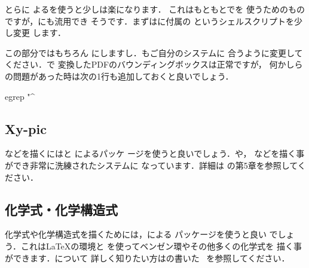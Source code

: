 \begin{InTeX}
\usepackage[dvipdfmx]{graphicx}
\end{InTeX}

とらに
よるを使うと少しは楽になります．
これはもともとでを
使うためのものですが，\prog{\pLaTeX}にも流用でき
そうです．まずはに付属の
というシェルスクリプトを少し変更
します．


この部分ではもちろん
にしますし．もご自分のシステムに
合うように変更してください．で
変換したPDFのバウンディングボックスは正常ですが，
何かしらの問題があった時は次の1行も追加しておくと良いでしょう．

\begin{InText}
    egrep "^%
\end{InText}


\subsection{Xy-pic}
などを描くにはと
によるパッケ
ージを使うと良いでしょう．や，
などを描く事ができ非常に洗練されたシステムに
なっています．詳細は\wasyo{\GCOMP}\cite{graphicscomp}
の第5章を参照してください．

\subsection{化学式・化学構造式}
化学式や化学構造式を描くためには，による
パッケージを使うと良い
でしょう．これは{\LaTeX}の環境と
を使ってベンゼン環やその他多くの化学式を
描く事ができます．\Prog[XyMTeX]{\XyMTeX}について
詳しく知りたい方はの書いた
\yousyo{\XyMTeX}~\cite{xymtex}を参照してください．


